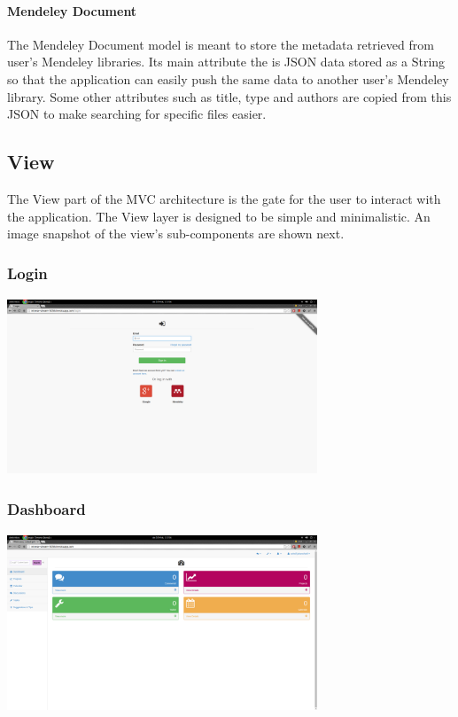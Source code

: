 \paragraph{Mendeley Document} %
The Mendeley Document model is meant to store the metadata retrieved from user's Mendeley libraries. Its main attribute the is JSON data
stored as a String so that the application can easily push the same data to another user's Mendeley library. Some other attributes such as
title, type and authors are copied from this JSON to make searching for specific files easier.

\subsection{View} %
The View part of the MVC architecture is the gate for the user to interact with the application. The View layer is designed to be simple
and minimalistic. An image snapshot of the view's sub-components are shown next.
\subsubsection{Login}

\begin{center}
\includegraphics[height=200px, width=350px]{./img/dsgn_img/login.png}
	
\end{center}

\subsubsection{Dashboard}

\begin{center}
\includegraphics[height=200px, width=350px]{./img/dsgn_img/dashboard.png}
	
\end{center}

